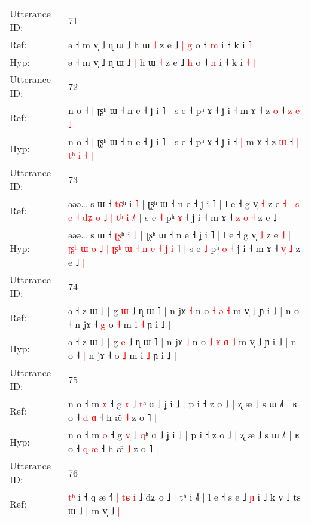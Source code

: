 \documentclass[10pt]{article}
\DeclareRobustCommand{\hl}[1]{{\textcolor{red}{#1}}}
\begin{document}
\begin{longtable}{ll}
\midrule
Utterance ID: & 71 \\
Ref: & ə ˧ m v̩ ˩ ɳ ɯ ˩\hl{}\hl{} h ɯ \hl{˩} z e ˩\hl{ }\hl{|} \hl{g} o ˧ \hl{m} i ˧ k i\hl{}\hl{} \hl{˥}
 \\
Hyp: & ə ˧ m v̩ ˩ ɳ ɯ ˩\hl{ }\hl{|} h ɯ \hl{˧} z e ˩\hl{}\hl{} \hl{h} o ˧ \hl{n} i ˧ k i\hl{ }\hl{˧} \hl{|}
 \\
\midrule
Utterance ID: & 72 \\
Ref: & n o ˧ | ʈʂʰ ɯ ˧ n e ˧ ʝ i ˥ | s e ˧ pʰ ɤ ˧ ʝ i ˧\hl{}\hl{} m ɤ ˧ z \hl{o} ˧\hl{}\hl{}\hl{}\hl{}\hl{} \hl{z} \hl{e} \hl{˩}
 \\
Hyp: & n o ˧ | ʈʂʰ ɯ ˧ n e ˧ ʝ i ˥ | s e ˧ pʰ ɤ ˧ ʝ i ˧\hl{ }\hl{|} m ɤ ˧ z \hl{ɯ} ˧\hl{ }\hl{|}\hl{ }\hl{t}\hl{ʰ} \hl{i} \hl{˧} \hl{|}
 \\
\midrule
Utterance ID: & 73 \\
Ref: & əəə… s ɯ ˧ \hl{t}\hl{ɕ}ʰ i \hl{˥} | ʈʂʰ ɯ ˧ n e ˧ ʝ i ˥ | l e ˧ g v̩ \hl{˧} z e \hl{˧} |\hl{}\hl{}\hl{}\hl{}\hl{}\hl{} \hl{s} \hl{e} \hl{˧} \hl{}\hl{d}\hl{ʑ} \hl{o} \hl{˩} \hl{|} \hl{}\hl{t}\hl{ʰ} \hl{i} \hl{}\hl{˩}˥ | s e \hl{˧} pʰ \hl{ɤ} ˧ ʝ i ˧ m ɤ ˧ \hl{z}\hl{ }\hl{o} \hl{˧} z e ˩\hl{}\hl{}
 \\
Hyp: & əəə… s ɯ ˧ \hl{ʈ}\hl{ʂ}ʰ i \hl{˩} | ʈʂʰ ɯ ˧ n e ˧ ʝ i ˥ | l e ˧ g v̩ \hl{˩} z e \hl{˩} |\hl{ }\hl{ʈ}\hl{ʂ}\hl{ʰ}\hl{ }\hl{ɯ} \hl{o} \hl{˩} \hl{|} \hl{ʈ}\hl{ʂ}\hl{ʰ} \hl{ɯ} \hl{˧} \hl{n} \hl{e}\hl{ }\hl{˧} \hl{ʝ} \hl{i}\hl{ }˥ | s e \hl{˩} pʰ \hl{o} ˧ ʝ i ˧ m ɤ ˧ \hl{}\hl{v}\hl{̩} \hl{˩} z e ˩\hl{ }\hl{|}
 \\
\midrule
Utterance ID: & 74 \\
Ref: & ə ˧ z ɯ ˩ | g \hl{ɯ} ˩ ɳ ɯ ˥ | n jɤ \hl{˧} n o\hl{}\hl{} \hl{˧} \hl{ə} \hl{˧} m v̩ ˩ ɲ i ˩ | n o ˧\hl{}\hl{} n jɤ ˧\hl{ }\hl{g} o \hl{˧} m i \hl{˧} ɲ i ˩ |
 \\
Hyp: & ə ˧ z ɯ ˩ | g \hl{e} ˩ ɳ ɯ ˥ | n jɤ \hl{˩} n o\hl{ }\hl{˩} \hl{ʁ} \hl{ɑ} \hl{˩} m v̩ ˩ ɲ i ˩ | n o ˧\hl{ }\hl{|} n jɤ ˧\hl{}\hl{} o \hl{˩} m i \hl{˩} ɲ i ˩ |
 \\
\midrule
Utterance ID: & 75 \\
Ref: & n o ˧ m \hl{ɤ} ˧ g \hl{}\hl{ɤ} ˩ \hl{t}ʰ ɑ ˩ ʝ i ˩ | p i ˧ z o ˩ | ʐ æ ˩ s ɯ ˩˥ | ʁ o ˧ \hl{d} \hl{ɑ} ˧ h æ̃ \hl{˧} z o ˥ |
 \\
Hyp: & n o ˧ m \hl{o} ˧ g \hl{v}\hl{̩} ˩ \hl{q}ʰ ɑ ˩ ʝ i ˩ | p i ˧ z o ˩ | ʐ æ ˩ s ɯ ˩˥ | ʁ o ˧ \hl{q} \hl{æ} ˧ h æ̃ \hl{˩} z o ˥ |
 \\
\midrule
Utterance ID: & 76 \\
Ref: & \hl{t}\hl{ʰ} i ˧ q æ ˧\hl{˥}\hl{ }\hl{|} \hl{t}\hl{ɕ} \hl{i} ˩ dʑ o ˩ | tʰ i ˩˥ | l e ˧ s e ˩ \hl{ɲ} i ˩ k v̩ ˩ ts ɯ ˩ | m v̩ ˩\hl{ }\hl{|}

\end{longtable}
\end{document}

